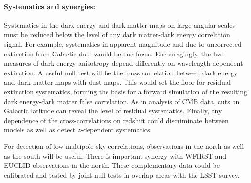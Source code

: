 \paragraph{Systematics and synergies:}
Systematics in the dark energy and dark matter maps on large angular scales must be reduced below the level of any dark matter-dark energy correlation signal.  
For example, systematics in apparent magnitude and \photoz due to uncorrected extinction from Galactic dust would be one focus. 
Encouragingly, the two measures of dark energy anisotropy depend differently on wavelength-dependent extinction. 
A useful null test will be the cross correlation between dark energy and dark matter maps with dust maps.  
This would set the floor for residual extinction systematics, forming the basis for a forward simulation of the resulting dark energy-dark matter false correlation. 
As in analysis of CMB data, cuts on Galactic latitude can reveal the level of residual systematics. 
Finally, any dependence of the cross-correlations on redshift could discriminate between models as well as detect $z$-dependent systematics.

For detection of low multipole sky correlations, observations in the north as well as the south will be useful.
There is important synergy with WFIRST and EUCLID observations in the north.  
These complementary data could be calibrated and tested by joint null tests in overlap areas with the LSST survey.

